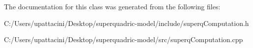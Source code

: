 The documentation for this class was generated from the following files\+:\begin{DoxyCompactItemize}
\item 
C\+:/\+Users/upattacini/\+Desktop/superquadric-\/model/include/superq\+Computation.\+h\item 
C\+:/\+Users/upattacini/\+Desktop/superquadric-\/model/src/superq\+Computation.\+cpp\end{DoxyCompactItemize}
